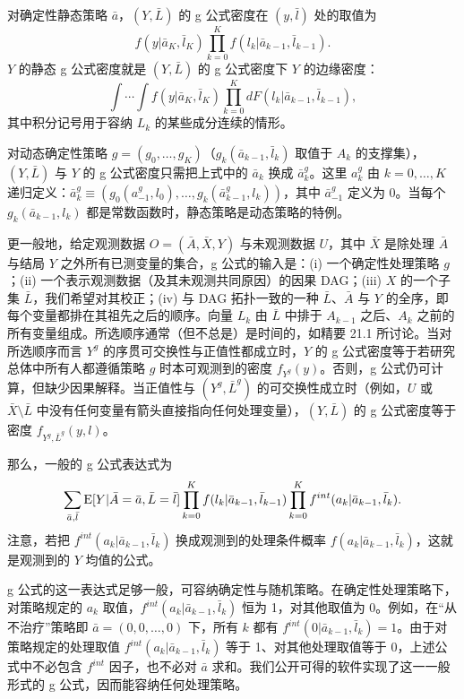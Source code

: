 \renewcommand{\TPname}{技术注记（Technical Point）}
\begin{techpoint}[g 公式密度]
对确定性静态策略 $\bar a$，$(Y,\bar L)$ 的 g 公式密度在 $(y,\bar l)$ 处的取值为
\[
f(y|\bar a_K,\bar l_K)\prod_{k=0}^{K}f(l_k|\bar a_{k-1},\bar l_{k-1}).
\]
$Y$ 的静态 g 公式密度就是 $(Y,\bar L)$ 的 g 公式密度下 $Y$ 的边缘密度：
\[
\int\cdots\int f(y|\bar a_K,\bar l_K)\prod_{k=0}^{K}dF(l_k|\bar a_{k-1},\bar l_{k-1}),
\]
其中积分记号用于容纳 $L_k$ 的某些成分连续的情形。

对动态确定性策略 $g=(g_0,\dots,g_K)$（$g_k(\bar a_{k-1},\bar l_k)$ 取值于 $A_k$ 的支撑集），$(Y,\bar L)$ 与 $Y$ 的 g 公式密度只需把上式中的 $\bar a_k$ 换成 $\bar a_k^g$。这里 $a_k^g$ 由 $k=0,\dots,K$ 递归定义：$\bar a_k^g\equiv(g_0(a^g_{-1},l_0),\dots,g_k(\bar a^g_{k-1},l_k))$，其中 $\bar a^g_{-1}$ 定义为 0。当每个 $g_k(\bar a_{k-1},l_k)$ 都是常数函数时，静态策略是动态策略的特例。

更一般地，给定观测数据 $O=(\bar A,\bar X,Y)$ 与未观测数据 $U$，其中 $\bar X$ 是除处理 $\bar A$ 与结局 $Y$ 之外所有已测变量的集合，g 公式的输入是：(i) 一个确定性处理策略 $g$；(ii) 一个表示观测数据（及其未观测共同原因）的因果 DAG；(iii) $X$ 的一个子集 $\bar L$，我们希望对其校正；(iv) 与 DAG 拓扑一致的一种 $\bar L$、$\bar A$ 与 $Y$ 的全序，即每个变量都排在其祖先之后的顺序。向量 $L_k$ 由 $\bar L$ 中排于 $A_{k-1}$ 之后、$A_k$ 之前的所有变量组成。所选顺序通常（但不总是）是时间的，如精要 21.1 所讨论。当对所选顺序而言 $Y^g$ 的序贯可交换性与正值性都成立时，$Y$ 的 g 公式密度等于若研究总体中所有人都遵循策略 $g$ 时本可观测到的密度 $f_{Y^g}(y)$。否则，g 公式仍可计算，但缺少因果解释。当正值性与 $(Y^g,\bar L^g)$ 的可交换性成立时（例如，$U$ 或 $\bar X\setminus\bar L$ 中没有任何变量有箭头直接指向任何处理变量），$(Y,\bar L)$ 的 g 公式密度等于密度 $f_{Y^g,\bar L^g}(y,l)$。
\end{techpoint}
\renewcommand{\TPname}{技术注记}


那么，一般的 g 公式表达式为
\[
\sum_{\bar a,\bar l}\mathrm{E}[Y|\bar A=\bar a,\bar L=\bar l]\prod_{k=0}^{K}f(l_k|\bar a_{k-1},\bar l_{k-1})\prod_{k=0}^{K}f^{int}(a_k|\bar a_{k-1},\bar l_k).
\]
注意，若把 $f^{int}(a_k|\bar a_{k-1},\bar l_k)$ 换成观测到的处理条件概率 $f(a_k|\bar a_{k-1},\bar l_k)$，这就是观测到的 $Y$ 均值的公式。

g 公式的这一表达式足够一般，可容纳确定性与随机策略。在确定性处理策略下，对策略规定的 $a_k$ 取值，$f^{int}(a_k|\bar a_{k-1},\bar l_k)$ 恒为 1，对其他取值为 0。例如，在“从不治疗”策略即 $\bar a=(0,0,\dots,0)$ 下，所有 $k$ 都有 $f^{int}(0|\bar a_{k-1},\bar l_k)=1$。由于对策略规定的处理取值 $f^{int}(a_k|\bar a_{k-1},\bar l_k)$ 等于 1、对其他处理取值等于 0，上述公式中不必包含 $f^{int}$ 因子，也不必对 $\bar a$ 求和。我们公开可得的软件实现了这一一般形式的 g 公式，因而能容纳任何处理策略。

